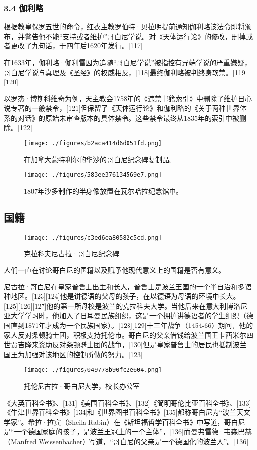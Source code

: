 \subsubsection{3.4 伽利略}
根据教皇保罗五世的命令，红衣主教罗伯特·贝拉明提前通知伽利略该法令即将颁布，并警告他不能“支持或者维护”哥白尼学说。对《天体运行论》的修改，删掉或者更改了九句话，于四年后1620年发行。[117]

在1633年，伽利略·伽利雷因为追随“哥白尼学说”被指控有异端学说的严重嫌疑，哥白尼学说与真理及《圣经》的权威相反，[118]最终伽利略被判终身软禁。[119][120]

以罗杰·博斯科维奇为例，天主教会1758年的《违禁书籍索引》中删除了维护日心说专著的一般禁令，[121]但保留了《天体运行论》和伽利略的《关于两种世界体系的对话》的原始未审查版本的具体禁令。这些禁令最终从1835年的索引中被删除。[122]
\begin{figure}[ht]
\centering
\texttt{[image: ./figures/b2aca414d6d051fd.png]}
\caption{在加拿大蒙特利尔的华沙的哥白尼纪念碑复制品。} \label{fig_GBN_27}
\end{figure}
\begin{figure}[ht]
\centering
\texttt{[image: ./figures/583ee376134569e7.png]}
\caption{1807年沙多制作的半身像放置在瓦尔哈拉纪念馆中。} \label{fig_GBN_28}
\end{figure}

\subsection{国籍}
\begin{figure}[ht]
\centering
\texttt{[image: ./figures/c3ed6ea80582c5cd.png]}
\caption{克拉科夫尼古拉·哥白尼纪念碑} \label{fig_GBN_29}
\end{figure}
人们一直在讨论哥白尼的国籍以及赋予他现代意义上的国籍是否有意义。

尼古拉·哥白尼在皇家普鲁士出生和长大，普鲁士是波兰王国的一个半自治和多语种地区。[123][124]他是讲德语的父母的孩子，在以德语为母语的环境中长大。[125][126][127]他的第一所母校是波兰的克拉科夫大学。当他后来在意大利博洛尼亚大学学习时，他加入了日耳曼民族组织，这是一个拥护讲德语者的学生组织（德国直到1871年才成为一个民族国家）。[128][129]十三年战争（1454-66）期间，他的家人反对条顿骑士团，积极支持托伦市。哥白尼的父亲借钱给波兰国王卡西米尔四世贾吉隆来资助反对条顿骑士团的战争，[130]但是皇家普鲁士的居民也抵制波兰国王为加强对该地区的控制所做的努力。[123]
\begin{figure}[ht]
\centering
\texttt{[image: ./figures/049778b90fc2e604.png]}
\caption{托伦尼古拉·哥白尼大学，校长办公室} \label{fig_GBN_30}
\end{figure}
《大英百科全书》、[131]《美国百科全书》、[132]《简明哥伦比亚百科全书》、[133]《牛津世界百科全书》[134]和《世界图书百科全书》[135]都称哥白尼为“波兰天文学家”。希拉·拉宾（Sheila Rabin）在《斯坦福哲学百科全书》中写道，哥白尼是“一个德国家庭的孩子，是波兰王冠上的一个主体”，[136]而曼弗雷德·韦森巴赫（Manfred Weissenbacher）写道，“哥白尼的父亲是一个德国化的波兰人”。[136]

